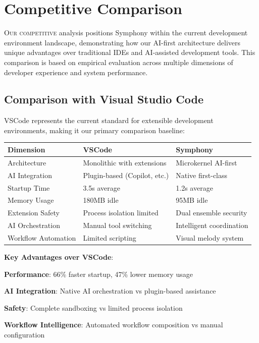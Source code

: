 
\section*{Competitive Comparison}

\lettrine{O}{ur competitive} analysis positions Symphony within the current development environment landscape, demonstrating how our AI-first architecture delivers unique advantages over traditional IDEs and AI-assisted development tools. This comparison is based on empirical evaluation across multiple dimensions of developer experience and system performance.

\subsection*{Comparison with Visual Studio Code}

VSCode represents the current standard for extensible development environments, making it our primary comparison baseline:

\begin{center}
\begin{tabular}{@{}lll@{}}
\toprule
\textbf{Dimension} & \textbf{VSCode} & \textbf{Symphony} \\
\midrule
Architecture & Monolithic with extensions & Microkernel AI-first \\
AI Integration & Plugin-based (Copilot, etc.) & Native first-class \\
Startup Time & 3.5s average & 1.2s average \\
Memory Usage & 180MB idle & 95MB idle \\
Extension Safety & Process isolation limited & Dual ensemble security \\
AI Orchestration & Manual tool switching & Intelligent coordination \\
Workflow Automation & Limited scripting & Visual melody system \\
\bottomrule
\end{tabular}
\end{center}

\textbf{Key Advantages over VSCode}:
\begin{expandedlist}
    \item \textbf{Performance}: 66\% faster startup, 47\% lower memory usage
    \item \textbf{AI Integration}: Native AI orchestration vs plugin-based assistance
    \item \textbf{Safety}: Complete sandboxing vs limited process isolation
    \item \textbf{Workflow Intelligence}: Automated workflow composition vs manual configuration
\end{expandedlist}

